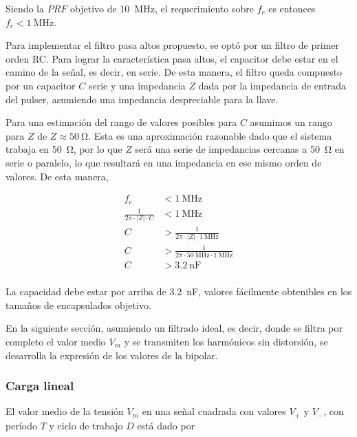 Siendo la $PRF$ objetivo de \qty{10}{\mega\hertz}, el requerimiento sobre $f_c$
es entonces $f_c < \qty{1}{\mega\hertz}$.

Para implementar el filtro pasa altos propuesto, se optó por un filtro de primer
orden RC. Para lograr la característica pasa altos, el capacitor debe estar en
el camino de la señal, es decir, en serie. De esta manera, el filtro queda
compuesto por un capacitor $C$ serie y una impedancia $Z$ dada por la impedancia
de entrada del pulser, asumiendo una impedancia despreciable para la llave.

Para una estimación del rango de valores posibles para $C$ asumimos un rango
para $Z$ de $ Z \approx \qty{50}{\ohm}$. Esta es una aproximación razonable dado
que el sistema trabaja en \qty{50}{\ohm}, por lo que $Z$ será una serie de
impedancias cercanas a \qty{50}{\ohm} en serie o paralelo, lo que resultará en
una impedancia en ese mismo orden de valores. De esta manera,

\begin{equation}
    \begin{aligned}
        f_c &< \qty{1}{\mega\hertz} \\
        \frac{1}{2\pi \cdot |Z| \cdot C} &< \qty{1}{\mega\hertz} \\
        C &> \frac{1}{2\pi \cdot |Z| \cdot \qty{1}{\mega\hertz}} \\
        C &> \frac{1}{2\pi \cdot \qty{50}{\mega\hertz} \cdot \qty{1}{\mega\hertz}} \\
        C &> \qty{3.2}{\nano\farad} \\
    \end{aligned}
\end{equation}

La capacidad debe estar por arriba de \qty{3.2}{\nano\farad}, valores fácilmente
obtenibles en los tamaños de encapsulados objetivo.

En la siguiente sección, asumiendo un filtrado ideal, es decir, donde se filtra
por completo el valor medio $V_m$ y se transmiten los harmónicos sin distorsión,
se desarrolla la expresión de los valores de la bipolar.

\subsubsection{Carga lineal}

El valor medio de la tensión $V_m$ en una señal cuadrada con valores $V_+$ y
$V_-$, con período $T$ y ciclo de trabajo $D$ está dado por

